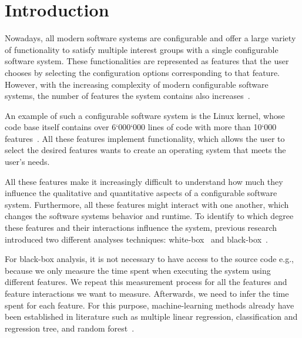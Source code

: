 \chapter{Introduction}\label{ch:introduction}

Nowadays, all modern software systems are configurable and offer a large variety of functionality to satisfy multiple 
interest groups with a single configurable software system. These functionalities are represented as features that the user chooses by selecting the 
configuration options corresponding to that feature. However, with the increasing complexity of modern configurable software systems, 
the number of features the system contains also increases~\cite{Feature-Oriented-Software-Product-Lines}.


An example of such a configurable software system is the Linux kernel, whose
code base itself contains over 6‘000‘000 lines of code with more than 10‘000 features~\cite{Linux-Kernel}.
All these features implement functionality, which allows the user to select the desired features
wants to create an operating system that meets the user’s needs.

All these features make it increasingly difficult to understand how much they influence the qualitative and quantitative
aspects of a configurable software system. 
Furthermore, all these features might interact with one another, which changes the software systems behavior and runtime. 
To identify to which degree these features and their interactions influence the system, previous research introduced two different analyses techniques: 
white-box~\cite{Comprex, ConfigCrusher} and black-box~\cite{Linear-Regression-Performance, Performance-influence-models-for-highly-configurable-systems}.

For black-box analysis, 
it is not necessary to have access to the source code e.g., because we only measure the time spent when executing the system using different features. 
We repeat this measurement process for all the features and feature interactions we want to measure. 
Afterwards, we need to infer the time spent for each feature. 
For this purpose, machine-learning methods already have been established in literature such as multiple linear regression, 
classification and regression tree, and random forest~\cite{Interplay-of-sampling, Performance-influence-models-for-highly-configurable-systems, Linear-Regression-Performance}.

